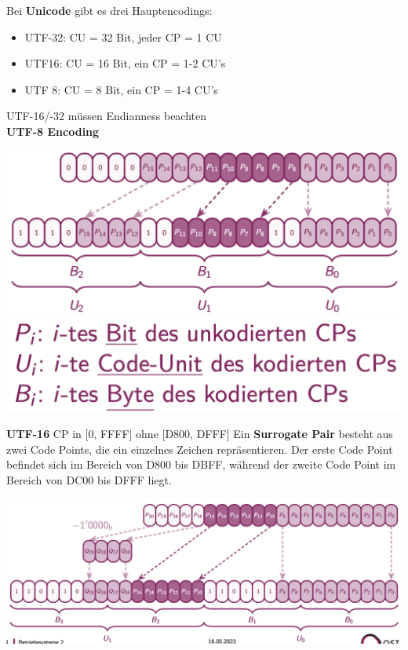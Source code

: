 \documentclass[8pt]{extarticle}
\let\oldtextbf\textbf
\renewcommand{\textbf}{\tiny\oldtextbf}
\begin{document}
\begin{multicols*}{5}
	Bei \textbf{Unicode} gibt es drei Hauptencodings:
	\begin{itemize} [noitemsep, topsep=0pt, leftmargin=*]
		\item UTF-32: CU = 32 Bit, jeder CP = 1 CU
		\item UTF16: CU = 16 Bit, ein CP = 1-2 CU's
		\item UTF 8: CU = 8 Bit, ein CP = 1-4 CU's
	\end{itemize}
	UTF-16/-32 müssen Endianness beachten\\
	
	\textbf{UTF-8 Encoding}
	
	\includegraphics[scale=0.25]{UTF-8.png}
	\includegraphics[scale=0.15]{UTF_Codierung_Begriffe.png}
	
	\textbf{UTF-16} CP in [0, FFFF] ohne [D800, DFFF] Ein \textbf{Surrogate Pair} besteht aus zwei Code Points, die ein einzelnes Zeichen repräsentieren. Der erste Code Point befindet sich im Bereich von D800 bis DBFF, während der zweite Code Point im Bereich von DC00 bis DFFF liegt.
	
	\includegraphics[scale=0.225]{UTF-16.png}%


\end{multicols*}
\end{document}
